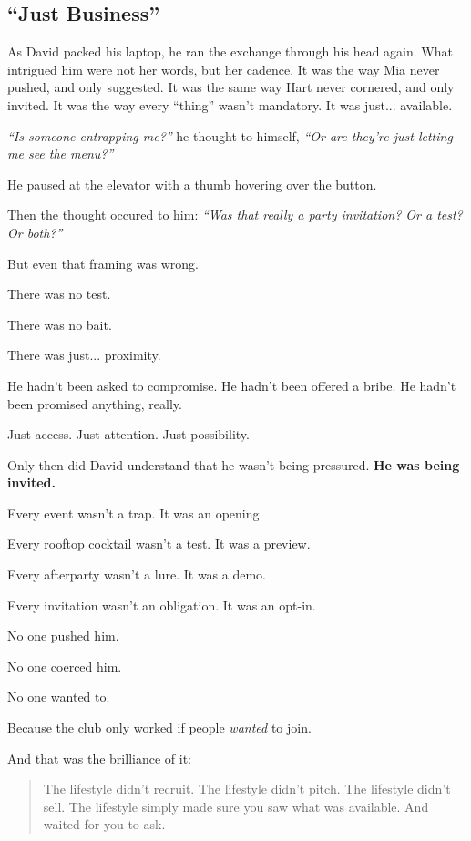 \subsection{``Just Business''}

As David packed his laptop, he ran the exchange through his head again. What intrigued him were not her words, 
but her cadence. It was the way Mia never pushed, and only suggested. It was the same way Hart never cornered, and only 
invited. It was the way every ``thing'' wasn’t mandatory. It was just... available.

\textit{``Is someone entrapping me?''} he thought to himself, \textit{``Or are they’re just letting me see the menu?''}

He paused at the elevator with a thumb hovering over the button.

Then the thought occured to him: \textit{``Was that really a party invitation? Or a test? Or both?''}

But even that framing was wrong.

There was no test.

There was no bait.

There was just... proximity.

He hadn’t been asked to compromise.
He hadn’t been offered a bribe.
He hadn’t been promised anything, really.

Just access.
Just attention.
Just possibility.

Only then did David understand that he wasn't being pressured. \textbf{He was being invited.}

Every event wasn’t a trap. It was an opening.

Every rooftop cocktail wasn’t a test. It was a preview.  

Every afterparty wasn’t a lure. It was a demo.  

Every invitation wasn’t an obligation. It was an opt-in.

No one pushed him. 

No one coerced him. 

No one wanted to. 

Because the club only worked if people \textit{wanted} to join.

And that was the brilliance of it:

\begin{quote}
The lifestyle didn’t recruit.  
The lifestyle didn’t pitch.  
The lifestyle didn’t sell.  
The lifestyle simply made sure you saw what was available.  
And waited for you to ask.
\end{quote}

